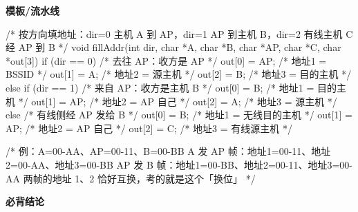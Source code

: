 \documentclass[10pt,a4paper]{ctexart}
\begin{document}

\textbf{模板/流水线}

\begin{codebox}
/* 按方向填地址：dir=0 主机 A 到 AP，dir=1 AP 到主机 B，dir=2 有线主机 C 经 AP 到 B */
void fillAddr(int dir, char *A, char *B, char *AP, char *C, char *out[3]) {
    if (dir == 0) {              /* 去往 AP：收方是 AP */
        out[0] = AP;             /* 地址1 = BSSID */
        out[1] = A;              /* 地址2 = 源主机 */
        out[2] = B;              /* 地址3 = 目的主机 */
    } else if (dir == 1) {       /* 来自 AP：收方是主机 B */
        out[0] = B;              /* 地址1 = 目的主机 */
        out[1] = AP;             /* 地址2 = AP 自己 */
        out[2] = A;              /* 地址3 = 源主机 */
    } else {                     /* 有线侧经 AP 发给 B */
        out[0] = B;              /* 地址1 = 无线目的主机 */
        out[1] = AP;             /* 地址2 = AP 自己 */
        out[2] = C;              /* 地址3 = 有线源主机 */
    }
}

/* 例：A=00-AA、AP=00-11、B=00-BB
   A 发 AP 帧：地址1=00-11、地址2=00-AA、地址3=00-BB
   AP 发 B 帧：地址1=00-BB、地址2=00-11、地址3=00-AA
   两帧的地址 1、2 恰好互换，考的就是这个「换位」 */
\end{codebox}




\textbf{必背结论}
\end{document}
